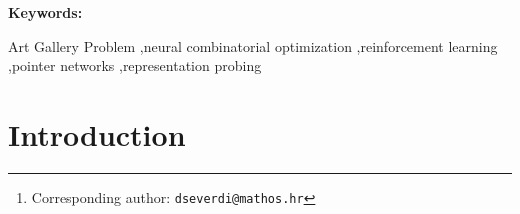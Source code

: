 \documentclass[11pt]{article}
\begin{document}
\ifdefined\arxiv
  \title{\PaperTitle}
  \author{%
    Domagoj Ševerdija\thanks{Corresponding author: \texttt{dseverdi@mathos.hr}} \and
    Jurica Maltar \and
    Nathan Chappel \and
    Domagoj Matijević\\[0.5em]
    \normalsize \PaperAffil}
  \date{}
  \maketitle
  \begin{abstract}
  \PaperAbstract
  \end{abstract}
  \noindent\textbf{Keywords:} \PaperKeywordsArxiv
  \vspace{1em}
\else
\begin{frontmatter}

\title{\PaperTitle}

\author[osijek]{Domagoj Ševerdija}
\author[osijek]{Jurica Maltar}
\author[]{Nathan Chappel}
\author[osijek]{Domagoj Matijević}


\address[osijek]{\PaperAffil}

\begin{abstract}
\PaperAbstract
\end{abstract}

\begin{keyword}
Art Gallery Problem \sep neural combinatorial optimization \sep reinforcement learning \sep pointer networks \sep representation probing
\end{keyword}

\end{frontmatter}
\fi


\section{Introduction}
\label{sec:intro}
\end{document}
